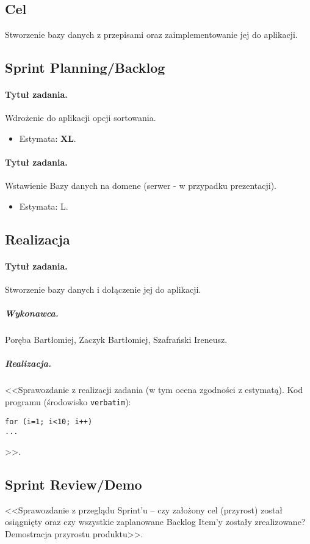 \documentclass[a4paper]{article}
\begin{document}
\subsection{Cel} Stworzenie bazy danych z przepisami oraz zaimplementowanie jej do aplikacji.

\subsection{Sprint Planning/Backlog}

\paragraph{Tytuł zadania.} Wdrożenie do aplikacji opcji sortowania.
\begin{itemize}
	\item Estymata: \textbf{XL}.
\end{itemize}

\paragraph{Tytuł zadania.} Wstawienie Bazy danych na domene (serwer - w przypadku prezentacji).
\begin{itemize}
	\item Estymata: L.
\end{itemize}


\subsection{Realizacja}

\paragraph{Tytuł zadania.}  Stworzenie bazy danych i dołączenie jej do aplikacji.
\subparagraph{Wykonawca.} Poręba Bartłomiej, Zaczyk Bartłomiej, Szafrański Ireneusz.
\subparagraph{Realizacja.} <<Sprawozdanie z realizacji zadania (w tym ocena zgodności z estymatą). Kod programu (środowisko \texttt{verbatim}): \begin{verbatim}
for (i=1; i<10; i++)
...
\end{verbatim}>>.



\subsection{Sprint Review/Demo}
<<Sprawozdanie z przeglądu Sprint'u -- czy założony cel (przyrost) został osiągnięty oraz czy wszystkie zaplanowane Backlog Item'y zostały zrealizowane? Demostracja przyrostu produktu>>.
\end{document}
